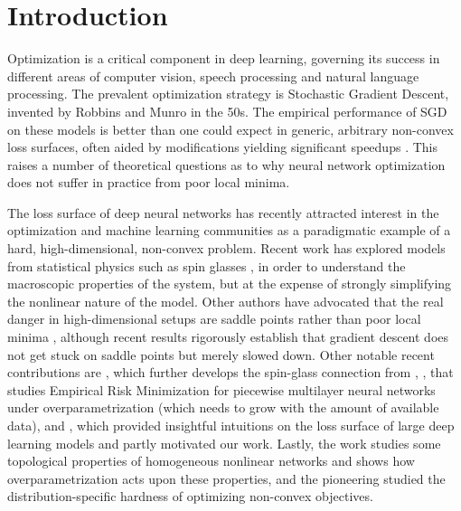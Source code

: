 \section{Introduction}
\label{sec:Intro}

%


Optimization is a critical component in deep learning, governing its success in different areas of computer vision, speech processing and natural language processing. The prevalent optimization strategy is Stochastic Gradient Descent, invented by Robbins and Munro in the 50s. The empirical performance of SGD on these models is better than one could expect in generic, arbitrary non-convex loss surfaces, often aided by modifications yielding significant speedups \cite{duchi2011adaptive, hinton2012lecture, ioffe2015batch, kingma2014adam}. This raises a number of theoretical questions as to why neural network optimization does not suffer in practice from poor local minima. 

The loss surface of deep neural networks has recently attracted interest 
in the optimization and machine learning communities as a paradigmatic example of 
a hard, high-dimensional, non-convex problem. 
Recent work has explored models from statistical physics such as spin glasses \cite{choromanska2015loss}, 
in order to understand the macroscopic properties of the system, but at the expense of strongly simplifying the nonlinear nature of the model. Other authors have advocated 
that the real danger in high-dimensional setups are saddle points 
rather than poor local minima \cite{dauphin2014identifying}, although 
recent results rigorously establish that gradient descent does not 
get stuck on saddle points \cite{lee2016gradient} but merely slowed down. 
Other notable recent contributions are \cite{kawaguchi2016deep}, which further develops the spin-glass 
connection from \cite{choromanska2015loss}, \cite{soudry2016no}, that studies Empirical Risk Minimization for piecewise multilayer neural networks under overparametrization (which needs to grow with the amount of available data), and \cite{goodfellow2014qualitatively}, which provided insightful intuitions on the loss surface of large deep learning models and partly motivated our work. Lastly, the work \cite{safran2015quality} studies some topological 
properties of homogeneous nonlinear networks and shows how overparametrization acts upon these properties, and the pioneering \cite{shamir2} studied the distribution-specific hardness of optimizing non-convex objectives.

